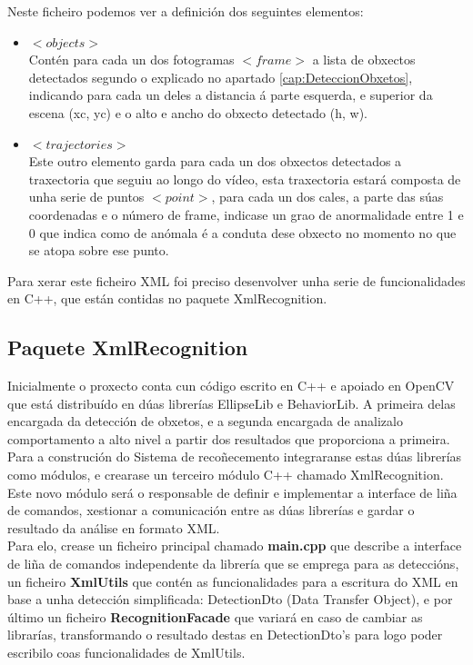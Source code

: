 		Neste ficheiro podemos ver a definición dos seguintes elementos:
		\begin{itemize}
		\item{{\textbf{$<objects>$\\}}}
			Contén para cada un dos fotogramas $<frame>$ a lista de obxectos detectados segundo
			o explicado no apartado \ref{cap:DeteccionObxetos}, indicando para cada un deles a
			distancia á parte esquerda, e superior da escena (xc, yc) e o alto e ancho do obxecto
			detectado (h, w).
		\item{{\textbf{$<trajectories>$\\}}}
			Este outro elemento garda para cada un dos obxectos detectados a traxectoria que 
			seguiu ao longo do vídeo, esta traxectoria estará composta de unha serie de puntos
			$<point>$, para cada un dos cales, a parte das súas coordenadas e o número de 
			frame, indicase un grao de anormalidade entre 1 e 0 que indica como de anómala é 
			a conduta dese obxecto no momento no que se atopa sobre ese punto.
		\end{itemize}
		
		Para xerar este ficheiro XML foi preciso desenvolver unha serie de funcionalidades en C++,
		que están contidas no paquete XmlRecognition.
	
	\subsection{Paquete XmlRecognition}
		Inicialmente o proxecto conta cun código escrito en C++ e apoiado en OpenCV que está distribuído en
		dúas librerías EllipseLib e BehaviorLib. A primeira delas encargada da detección de obxetos, e a segunda
		encargada de analizalo comportamento a alto nivel a partir dos resultados que proporciona a primeira.\\
		
		Para a construción do Sistema de recoñecemento integraranse estas dúas librerías como módulos, e 
		crearase un terceiro módulo C++ chamado XmlRecognition. Este novo módulo será o responsable de definir e
		implementar a interface de liña de comandos, xestionar a comunicación entre as dúas librerías e gardar
		o resultado da análise en formato XML.\\
		
		Para elo, crease un ficheiro principal chamado \textbf{main.cpp} que describe a interface de liña de comandos
		independente da librería que se emprega para as deteccións, un ficheiro \textbf{XmlUtils} que contén as
		funcionalidades para a escritura do XML en base a unha detección simplificada: DetectionDto 
		(Data Transfer Object), e por último un ficheiro \textbf{RecognitionFacade} que variará en 
		caso de cambiar as librarías, transformando o resultado destas en DetectionDto's para logo
		poder escribilo coas funcionalidades de XmlUtils.
		
